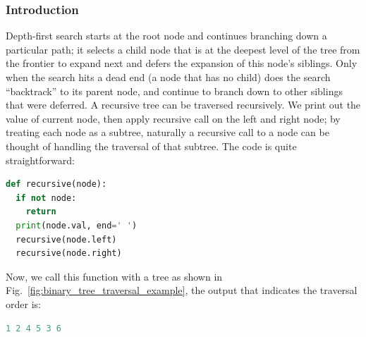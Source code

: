 \documentclass[main.tex]{subfiles}
\begin{document}
\subsubsection{Introduction}
Depth-first search starts at the root node and continues branching down a particular path; it selects a child node that is at the deepest level of the tree from the frontier to expand next and defers the expansion of this node's siblings. Only when the search hits a dead end (a node that has no child) does the search ``backtrack'' to its parent node, and continue to branch down to  other siblings that were deferred. A recursive tree can be traversed recursively. We print out the value of current node, then apply recursive call on the left and right node; by treating each node as a subtree, naturally a  recursive call to a  node can be  thought of handling the traversal of that subtree. The code is quite straightforward:

\begin{lstlisting}[language=Python]
def recursive(node):
  if not node:
    return
  print(node.val, end=' ')
  recursive(node.left)
  recursive(node.right)
\end{lstlisting}
Now, we call this function with a tree as shown in Fig.~\ref{fig:binary_tree_traversal_example}, the output that indicates the traversal order is:
\begin{lstlisting}[language=Python]
1 2 4 5 3 6 
\end{lstlisting}


\end{document}

